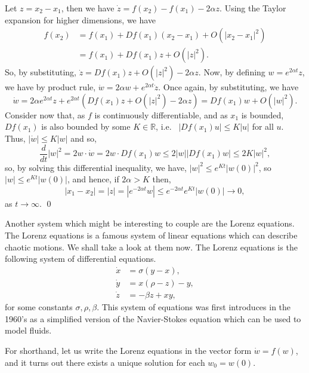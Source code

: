 \documentclass[
]{article}
\theoremstyle{definition}
\theoremstyle{definition}
\begin{document}
Let \(z = x_2 - x_1\), then we have
\(\dot z = f(x_2) - f(x_1) - 2 \alpha z\). Using the Taylor expansion
for higher dimensions, we have \begin{align*}
    f(x_2) & = f(x_1) + Df(x_1)(x_2 - x_1) + O(\left|x_2 - x_1\right|^2)\\
      & = f(x_1) + Df(x_1)z + O(\left|z \right|^2).
  \end{align*} So, by substituting,
\(\dot z = Df(x_1)z + O(\left| z\right|^2) - 2 \alpha z\). Now, by
defining \(w = e^{2\alpha t}z\), we have by product rule,
\(\dot w = 2 \alpha w + e^{2\alpha t} \dot z\). Once again, by
substituting, we have
\[\dot w = 2 \alpha e^{2 \alpha t}z + e^{2 \alpha t}
    (Df(x_1)z + O(\left| z\right|^2) - 2 \alpha z) = Df(x_1)w + O(\left| w \right|^2).\]
Consider now that, as \(f\) is continuously differentiable, and as
\(x_1\) is bounded, \(Df(x_1)\) is also bounded by some
\(K \in \mathbb{R}\), i.e.~
\(\left| Df(x_1)u \right| \le K\left| u \right|\) for all \(u\). Thus,
\(\left| \dot w \right| \le K \left| w \right|\) and so,
\[\frac{d}{dt}\left| w\right|^2 = 2w \cdot \dot w = 2w \cdot Df(x_1)w \le 
    2 \left| w \right| \left| Df(x_1) w \right| \le 2 K \left|w\right|^2,\]
so, by solving this differential inequality, we have,
\(\left|w\right|^2 \le e^{Kt}\left| w(0)\right|^2\), so
\(\left|w\right| \le e^{Kt}\left| w(0)\right|\), and hence, if
\(2\alpha > K\) then,
\[\left| x_1 - x_2\right| = \left| z \right| = \left| e^{-2\alpha t}w \right| 
    \le e^{-2\alpha t}e^{Kt} \left| w(0)\right| \to 0,\] as
\(t \to \infty\). \qed

Another system which might be interesting to couple are the Lorenz
equations. The Lorenz equations is a famous system of linear equations
which can describe chaotic motions. We shall take a look at them now.
The Lorenz equations is the following system of differential equations.
\begin{align*}
  \dot x & = \sigma (y - x),\\
  \dot y & = x(\rho - z) - y,\\
  \dot z & = - \beta z + xy,
\end{align*} for some constants \(\sigma, \rho, \beta\). This system of
equations was first introduces in the 1960's as a simplified version of
the Navier-Stokes equation which can be used to model fluids.

For shorthand, let us write the Lorenz equations in the vector form
\(\dot w = f(w)\), and it turns out there exists a unique solution for
each \(w_0 = w(0)\).
\end{document}
